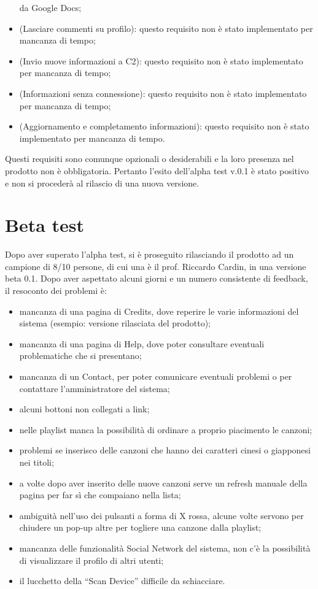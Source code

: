 \begin{itemize}
  da Google Docs;
  \item {} (Lasciare commenti su profilo): questo requisito non \`e
  stato implementato per mancanza di tempo;
  \item {} (Invio nuove informazioni a C2): questo requisito non \`e
  stato implementato per mancanza di tempo;
  \item {} (Informazioni senza connessione): questo requisito non \`e
  stato implementato per mancanza di tempo;
  \item {} (Aggiornamento e completamento informazioni): questo
  requisito non \`e stato implementato per mancanza di tempo.
\end{itemize}

Questi requisiti sono comunque opzionali o desiderabili e la loro presenza nel
prodotto non \`e obbligatoria. Pertanto l'esito dell'alpha test v.0.1 \`e stato
positivo e non si proceder\`a al rilascio di una nuova versione.

\section{Beta test}
Dopo aver superato l'alpha test, si \`e proseguito rilasciando il prodotto ad
un campione di 8/10 persone, di cui una \`e il prof. Riccardo Cardin, in una
versione beta 0.1. Dopo aver aspettato alcuni giorni e un numero consistente di
feedback, il resoconto dei problemi \`e:
\begin{itemize}
  \item mancanza di una pagina di Credits, dove reperire le varie informazioni
  del sistema (esempio: versione rilasciata del prodotto); 
  \item mancanza di una pagina di Help, dove poter consultare eventuali
  problematiche che si presentano;
  \item mancanza di un Contact, per poter comunicare eventuali problemi o
  per contattare l'amministratore del sistema;
  \item alcuni bottoni non collegati a link;
  \item nelle playlist manca la possibilit\`a di ordinare a proprio piacimento
  le canzoni;
  \item problemi se inserisco delle canzoni che hanno dei caratteri cinesi o
  giapponesi nei titoli;
  \item a volte dopo aver inserito delle nuove canzoni serve un refresh manuale
  della pagina per far s\`i che compaiano nella lista;
  \item ambiguit\`a nell'uso dei pulsanti a forma di X rossa, alcune volte
  servono per chiudere un pop-up altre per togliere una canzone dalla playlist;
  \item mancanza delle funzionalit\`a Social Network del sistema, non c'\`e la
  possibilit\`a di visualizzare il profilo di altri utenti;
  \item il lucchetto della ``Scan Device'' difficile da schiacciare.
\end{itemize}


